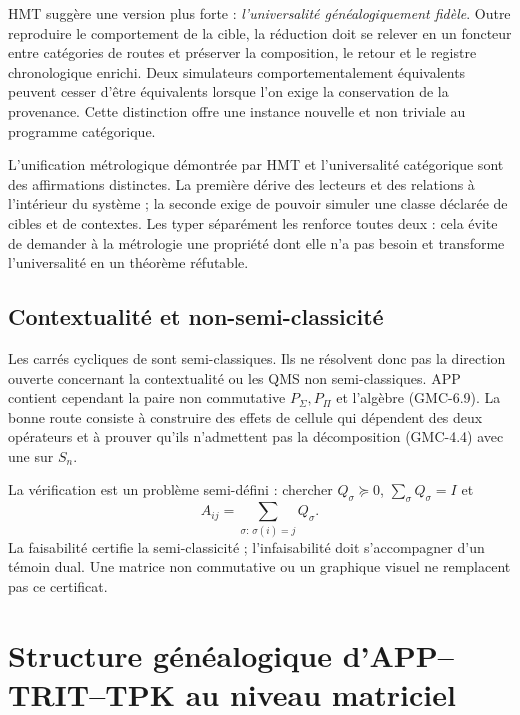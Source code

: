 \begin{bridgebox}
HMT suggère une version plus forte : \emph{l'universalité généalogiquement
fidèle}. Outre reproduire le comportement de la cible, la réduction doit
se relever en un foncteur entre catégories de routes et préserver la composition,
le retour et le registre chronologique enrichi. Deux simulateurs comportementalement équivalents peuvent cesser
d'être équivalents lorsque l'on exige la conservation de la provenance. Cette distinction
offre une instance nouvelle et non triviale au programme catégorique.
\end{bridgebox}

L'unification métrologique démontrée par HMT et l'universalité catégorique
sont des affirmations distinctes. La première dérive des lecteurs et des relations à l'intérieur
du système ; la seconde exige de pouvoir simuler une classe déclarée de cibles et de
contextes. Les typer séparément les renforce toutes deux : cela évite de demander à la métrologie
une propriété dont elle n'a pas besoin et transforme l'universalité en un théorème
réfutable.

\subsection{Contextualité et non-semi-classicité}

Les carrés cycliques de  sont semi-classiques. Ils ne
résolvent donc pas la direction ouverte concernant la contextualité ou les QMS non
semi-classiques. APP contient cependant la paire non commutative $P_\Sigma,P_\Pi$
et l'algèbre \textup{(GMC-6.9)}. La bonne route consiste à construire des effets de cellule qui
dépendent des deux opérateurs et à prouver qu'ils n'admettent pas la décomposition
\textup{(GMC-4.4)} avec une \POVM sur $S_n$.

La vérification est un problème semi-défini : chercher
$Q_\sigma\succeq0$, $\sum_\sigma Q_\sigma=I$ et
\[
 A_{ij}=\sum_{\sigma:\,\sigma(i)=j}Q_\sigma.
 \tag{GMC-8.6}
\]
La faisabilité certifie la semi-classicité ; l'infaisabilité doit s'accompagner d'un
témoin dual. Une matrice non commutative ou un graphique visuel ne remplacent pas
ce certificat.


\section{Structure généalogique d'APP--TRIT--TPK au niveau matriciel}
\label{p12-83-c22-s6:gmc:chap:hmt-profundidad}

